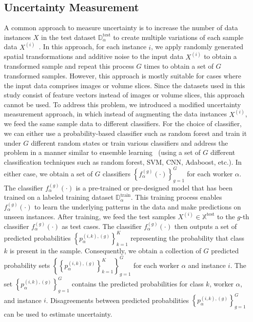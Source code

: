 \subsection{Uncertainty Measurement}\label{subsec:crowd.uncertainty}
A common approach to measure uncertainty is to increase the number of data instances $X $ in the test dataset $\mathbb{D}_\alpha^{\mathrm{test}} $ to create multiple variations of each sample data $X^{(i)} $~\cite{ayhan_TestTime_2018}. In this approach, for each instance $i $, we apply randomly generated spatial transformations and additive noise to the input data $X^{(i)} $ to obtain a transformed sample and repeat this process $G $ times to obtain a set of $G $ transformed samples.
However, this approach is mostly suitable for cases where the input data comprises images or volume slices. Since the datasets used in this study consist of feature vectors instead of images or volume slices, this approach cannot be used. To address this problem, we introduced a modified uncertainty measurement approach, in which instead of augmenting the data instances $X^{(i)} $, we feed the same sample data to different classifiers.
For the choice of classifier, we can either use a probability-based classifier such as random forest and train it under $G $ different random states or train various classifiers and address the problem in a manner similar to ensemble learning~\cite{zhou_Ensemblelearning_2009} (using a set of $G $ different classification techniques such as random forest, SVM, CNN, Adaboost, etc.). In either case, we obtain a set of $G $ classifiers ${\left\{f_{\alpha}^{(g)}( \cdot)\right\}}_{g=1}^G $ for each worker $\alpha $. The classifier $f_{\alpha}^{(g)}( \cdot) $ is a pre-trained or pre-designed model that has been trained on a labeled training dataset $\mathbb{D}_\alpha^{\mathrm{train}} $. This training process enables $f_{\alpha}^{(g)}(\cdot) $ to learn the underlying patterns in the data and make predictions on unseen instances.
After training, we feed the test samples $X^{(i)}\in \mathbb{X}^{\text{test}} $ to the $g $-th classifier $f_{\alpha}^{(g)}(\cdot) $ as test cases. The classifier $f_{\alpha}^{(g)}(\cdot) $ then outputs a set of predicted probabilities ${\left\{p_{\alpha}^{(i,k),(g)}\right\}}_{k=1}^{K} $ representing the probability that class $k $ is present in the sample. Consequently, we obtain a collection of $G $ predicted probability sets ${\left\{ {\left\{ p_{\alpha}^{(i,k),(g)}\right\}}_{k=1}^K \right\}}_{g=1}^G $ for each worker $\alpha $ and instance $i $. The set ${\left\{p_{\alpha}^{(i,k),(g)}\right\}}_{g=1}^G $ contains the predicted probabilities for class $k $, worker $\alpha $, and instance $i $. Disagreements between predicted probabilities ${\left\{p_{\alpha}^{(i,k),(g)}\right\}}_{g=1}^G $ can be used to estimate uncertainty.
